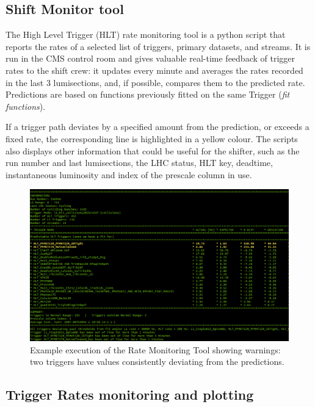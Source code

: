 \subsection{Shift Monitor tool}

The High Level Trigger (HLT) rate monitoring tool is a python script that reports the rates of a selected list of triggers, primary datasets, and streams. It is run in the CMS control room and gives valuable real-time feedback of trigger rates to the shift crew: it updates every minute and averages the rates recorded in the last 3 lumisections, and, if possible, compares them to the predicted rate. Predictions are based on functions previously fitted on the same Trigger (\textit{fit functions}).

If a trigger path deviates by a specified amount from the prediction, or exceeds a fixed rate, the corresponding line is highlighted in a yellow colour. The scripts also displays other information that could be useful for the shifter, such as the run number and last lumisections, the LHC status, HLT key, deadtime, instantaneous luminosity and index of the prescale column in use.

\begin{figure}
    \centerline{
        \includegraphics[width=0.8\paperwidth]{figures/ratemon_warnings}}
    \caption{Example execution of the Rate Monitoring Tool showing warnings: two triggers have values consistently deviating from the predictions. \cite{ratemon-twiki}}
    \label{fig:ratemon_warnings}
\end{figure}

\subsection{Trigger Rates monitoring and plotting}

